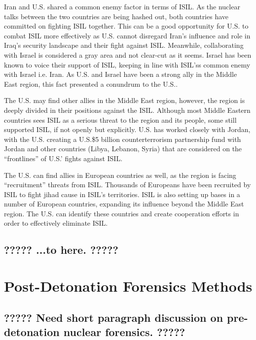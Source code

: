 \documentclass{report}
\begin{document}
Iran and U.S. shared a common enemy factor in terms of ISIL. As the nuclear talks between the two countries are being hashed out, both countries have committed on fighting ISIL together. This can be a good opportunity for U.S. to combat ISIL more effectively as U.S. cannot disregard Iran's influence and role in Iraq's security landscape and their fight against ISIL.
Meanwhile, collaborating with Israel is considered a gray area and not clear-cut as it seems. Israel has been known to voice their support of ISIL, keeping in line with ISIL'ss common enemy with Israel i.e. Iran. As U.S. and Israel have been a strong ally in the Middle East region, this fact presented a conundrum to the U.S..

The U.S. may find other allies in the Middle East region, however, the region is deeply divided in their positions against the ISIL. Although most Middle Eastern countries sees ISIL as a serious threat to the region and its people, some still supported ISIL, if not openly but explicitly. U.S. has worked closely with Jordan, with the U.S. creating a U.S.\$5 billion counterterrorism partnership fund with Jordan and other countries (Libya, Lebanon, Syria) that are considered on the \enquote{frontlines} of U.S.' fights against ISIL.

The U.S. can find allies in European countries as well, as the region is facing \enquote{recruitment} threats from ISIL. Thousands of Europeans have been recruited by ISIL to fight jihad cause in ISIL's territories. ISIL is also setting up bases in a number of European countries, expanding its influence beyond the Middle East region. The U.S. can identify these countries and create cooperation efforts in order to effectively eliminate ISIL.

\subsection{????? ...to here. ?????}







\section{Post-Detonation Forensics Methods}

\subsection{????? Need short paragraph discussion on pre-detonation nuclear forensics. ?????}
\end{document}
